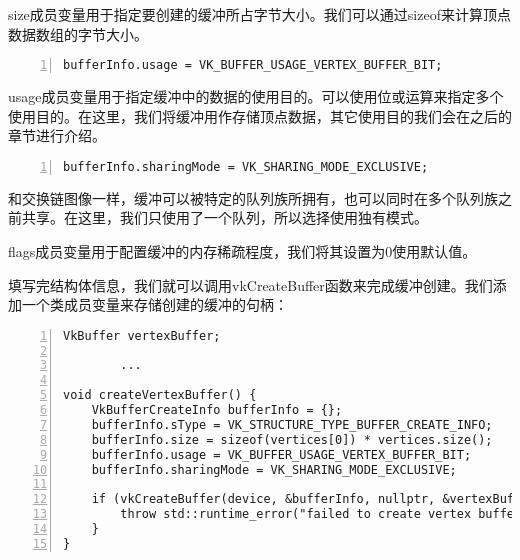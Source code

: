 \documentclass{ctexart}
\begin{document}
size成员变量用于指定要创建的缓冲所占字节大小。我们可以通过sizeof来计算顶点数据数组的字节大小。

\begin{lstlisting}[language={[ANSI]C},keywordstyle=\color{blue!70},commentstyle=\color{red!50!green!50!blue!50},frame=shadowbox, rulesepcolor=\color{red!20!green!20!blue!20},basicstyle=\small,numbers=left, numberstyle=\tiny,breaklines=true]
bufferInfo.usage = VK_BUFFER_USAGE_VERTEX_BUFFER_BIT;
\end{lstlisting}

usage成员变量用于指定缓冲中的数据的使用目的。可以使用位或运算来指定多个使用目的。在这里，我们将缓冲用作存储顶点数据，其它使用目的我们会在之后的章节进行介绍。

\begin{lstlisting}[language={[ANSI]C},keywordstyle=\color{blue!70},commentstyle=\color{red!50!green!50!blue!50},frame=shadowbox, rulesepcolor=\color{red!20!green!20!blue!20},basicstyle=\small,numbers=left, numberstyle=\tiny,breaklines=true]
bufferInfo.sharingMode = VK_SHARING_MODE_EXCLUSIVE;
\end{lstlisting}

和交换链图像一样，缓冲可以被特定的队列族所拥有，也可以同时在多个队列族之前共享。在这里，我们只使用了一个队列，所以选择使用独有模式。

flags成员变量用于配置缓冲的内存稀疏程度，我们将其设置为0使用默认值。

填写完结构体信息，我们就可以调用vkCreateBuffer函数来完成缓冲创建。我们添加一个类成员变量来存储创建的缓冲的句柄：

\begin{lstlisting}[language={[ANSI]C},keywordstyle=\color{blue!70},commentstyle=\color{red!50!green!50!blue!50},frame=shadowbox, rulesepcolor=\color{red!20!green!20!blue!20},basicstyle=\small,numbers=left, numberstyle=\tiny,breaklines=true]
VkBuffer vertexBuffer;

		...

void createVertexBuffer() {
	VkBufferCreateInfo bufferInfo = {};
	bufferInfo.sType = VK_STRUCTURE_TYPE_BUFFER_CREATE_INFO;
	bufferInfo.size = sizeof(vertices[0]) * vertices.size();
	bufferInfo.usage = VK_BUFFER_USAGE_VERTEX_BUFFER_BIT;
	bufferInfo.sharingMode = VK_SHARING_MODE_EXCLUSIVE;

	if (vkCreateBuffer(device, &bufferInfo, nullptr, &vertexBuffer) != VK_SUCCESS) {
		throw std::runtime_error("failed to create vertex buffer!");
	}
}
\end{lstlisting}
\end{document}
